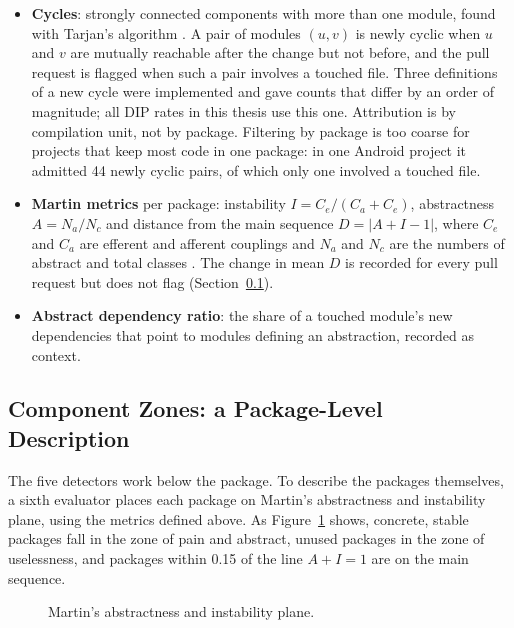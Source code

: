 \begin{itemize}
  \item \textbf{Cycles}: strongly connected components with more than one module, found with
  Tarjan's algorithm \citep{tarjan1972scc}. A pair of modules $(u,v)$ is newly cyclic when $u$ and
  $v$ are mutually reachable after the change but not before, and the pull request is flagged when
  such a pair involves a touched file. Three definitions of a new cycle were implemented and gave
  counts that differ by an order of magnitude; all DIP rates in this thesis use this one. Attribution
  is by compilation unit, not by package. Filtering by package is too coarse for projects that keep
  most code in one package: in one Android project it admitted 44 newly cyclic pairs, of which only
  one involved a touched file.
  \item \textbf{Martin metrics} per package: instability $I = C_e / (C_a + C_e)$, abstractness
  $A = N_a / N_c$ and distance from the main sequence $D = |A + I - 1|$, where $C_e$ and $C_a$ are
  efferent and afferent couplings and $N_a$ and $N_c$ are the numbers of abstract and total classes
  \citep{martin2003agile}. The change in mean $D$ is recorded for every pull request but does not
  flag (Section~\ref{sec:zones-detail}).
  \item \textbf{Abstract dependency ratio}: the share of a touched module's new dependencies that
  point to modules defining an abstraction, recorded as context.
\end{itemize}

\subsection{Component Zones: a Package-Level Description}
\label{sec:zones-detail}

The five detectors work below the package. To describe the packages themselves, a sixth evaluator
places each package on Martin's abstractness and instability plane, using the metrics defined
above. As Figure~\ref{fig:martin-plane} shows, concrete, stable packages fall in the zone of pain
and abstract, unused packages in the zone of uselessness, and packages within 0.15 of the line
$A+I=1$ are on the main sequence.

\begin{figure}[htb]
\centering

\caption{Martin's abstractness and instability plane.}
\label{fig:martin-plane}
\end{figure}

